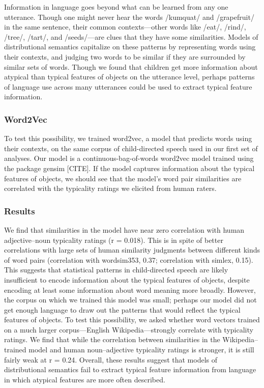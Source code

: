 \documentclass[10pt, letterpaper]{article}
\begin{document}
Information in language goes beyond what can be learned from any one
utterance. Though one might never hear the words /kumquat/ and
/grapefruit/ in the same sentence, their common contexts---other words
like /eat/, /rind/, /tree/, /tart/, and /seeds/---are clues that they
have some similarities. Models of distributional semantics capitalize on
these patterns by representing words using their contexts, and judging
two words to be similar if they are surrounded by similar sets of words.
Though we found that children get more information about atypical than
typical features of objects on the utterance level, perhaps patterns of
language use across many utterances could be used to extract typical
feature information.

\hypertarget{word2vec}{%
\subsubsection{Word2Vec}\label{word2vec}}

To test this possibility, we trained word2vec, a model that predicts
words using their contexts, on the same corpus of child-directed speech
used in our first set of analyses. Our model is a
continuous-bag-of-words word2vec model trained using the package gensim
{[}CITE{]}. If the model captures information about the typical features
of objects, we should see that the model's word pair similarities are
correlated with the typicality ratings we elicited from human raters.

\hypertarget{results-1}{%
\subsubsection{Results}\label{results-1}}

We find that similarities in the model have near zero correlation with
human adjective--noun typicality ratings (r = 0.018). This is in spite
of better correlations with large sets of human similarity judgments
between different kinds of word pairs (correlation with wordsim353,
0.37; correlation with simlex, 0.15). This suggests that statistical
patterns in child-directed speech are likely insufficient to encode
information about the typical features of objects, despite encoding at
least some information about word meaning more broadly. However, the
corpus on which we trained this model was small; perhaps our model did
not get enough language to draw out the patterns that would reflect the
typical features of objects. To test this possibility, we asked whether
word vectors trained on a much larger corpus---English
Wikipedia---strongly correlate with typicality ratings. We find that
while the correlation between similarities in the Wikipedia--trained
model and human noun--adjective typicality ratings is stronger, it is
still fairly weak at r = 0.24. Overall, these results suggest that
models of distributional semantics fail to extract typical feature
information from language in which atypical features are more often
described.
\end{document}
